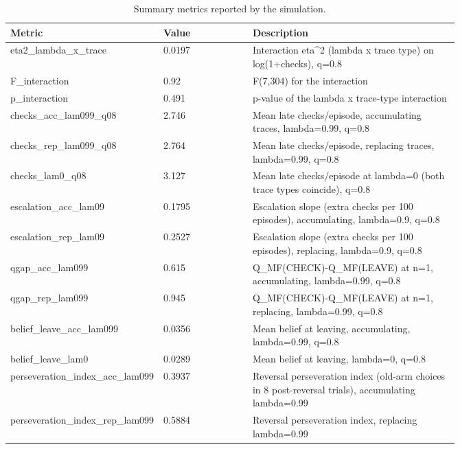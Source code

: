 \documentclass[11pt,a4paper]{article}
\begin{document}
\begin{table}[ht]
\centering\small
\caption{Summary metrics reported by the simulation.}\label{tab:metrics}
\begin{tabular}{p{0.3\linewidth} l p{0.46\linewidth}}
\toprule
Metric & Value & Description\\
\midrule
eta2\_\allowbreak{}lambda\_\allowbreak{}x\_\allowbreak{}trace & 0.0197 & Interaction eta\textasciicircum{}2 (lambda x trace type) on log(1+checks), q=0.8\\
F\_\allowbreak{}interaction & 0.92 & F(7,304) for the interaction\\
p\_\allowbreak{}interaction & 0.491 & p-value of the lambda x trace-type interaction\\
checks\_\allowbreak{}acc\_\allowbreak{}lam099\_\allowbreak{}q08 & 2.746 & Mean late checks/episode, accumulating traces, lambda=0.99, q=0.8\\
checks\_\allowbreak{}rep\_\allowbreak{}lam099\_\allowbreak{}q08 & 2.764 & Mean late checks/episode, replacing traces, lambda=0.99, q=0.8\\
checks\_\allowbreak{}lam0\_\allowbreak{}q08 & 3.127 & Mean late checks/episode at lambda=0 (both trace types coincide), q=0.8\\
escalation\_\allowbreak{}acc\_\allowbreak{}lam09 & 0.1795 & Escalation slope (extra checks per 100 episodes), accumulating, lambda=0.9, q=0.8\\
escalation\_\allowbreak{}rep\_\allowbreak{}lam09 & 0.2527 & Escalation slope (extra checks per 100 episodes), replacing, lambda=0.9, q=0.8\\
qgap\_\allowbreak{}acc\_\allowbreak{}lam099 & 0.615 & Q\_MF(CHECK)-Q\_MF(LEAVE) at n=1, accumulating, lambda=0.99, q=0.8\\
qgap\_\allowbreak{}rep\_\allowbreak{}lam099 & 0.945 & Q\_MF(CHECK)-Q\_MF(LEAVE) at n=1, replacing, lambda=0.99, q=0.8\\
belief\_\allowbreak{}leave\_\allowbreak{}acc\_\allowbreak{}lam099 & 0.0356 & Mean belief at leaving, accumulating, lambda=0.99, q=0.8\\
belief\_\allowbreak{}leave\_\allowbreak{}lam0 & 0.0289 & Mean belief at leaving, lambda=0, q=0.8\\
perseveration\_\allowbreak{}index\_\allowbreak{}acc\_\allowbreak{}lam099 & 0.3937 & Reversal perseveration index (old-arm choices in 8 post-reversal trials), accumulating lambda=0.99\\
perseveration\_\allowbreak{}index\_\allowbreak{}rep\_\allowbreak{}lam099 & 0.5884 & Reversal perseveration index, replacing lambda=0.99\\

\end{tabular}
\end{table}
\end{document}
